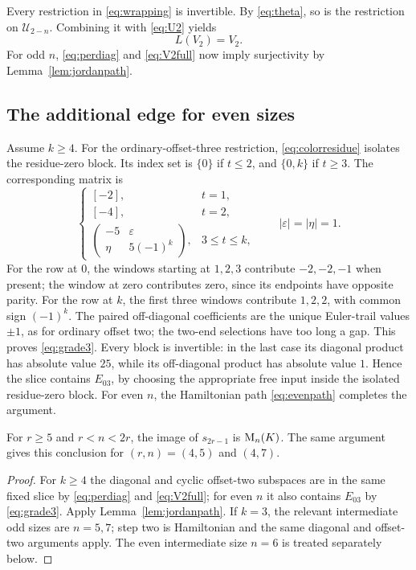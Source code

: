 Every restriction in \eqref{eq:wrapping} is invertible. By
\eqref{eq:theta}, so is the restriction on $\mathcal U_{2-n}$.
Combining it with \eqref{eq:U2} yields
\begin{equation}\label{eq:V2full}
 L(V_2)=V_2.
\end{equation}
For odd $n$, \eqref{eq:perdiag} and \eqref{eq:V2full}
now imply surjectivity by Lemma~\ref{lem:jordanpath}.

\subsection{The additional edge for even sizes}
Assume $k\ge4$. For the ordinary-offset-three restriction,
\eqref{eq:colorresidue} isolates the residue-zero block. Its
index set is $\{0\}$ if $t\le2$, and $\{0,k\}$ if $t\ge3$.
The corresponding matrix is
\begin{equation}\label{eq:grade3}
 \begin{cases}
 [-2],&t=1,\\{}[-4],&t=2,\\
 \begin{pmatrix}-5&\varepsilon\\\eta&5(-1)^k\end{pmatrix},
  &3\le t\le k,
 \end{cases}
 \qquad |\varepsilon|=|\eta|=1.
\end{equation}
For the row at $0$, the windows starting at $1,2,3$ contribute
$-2,-2,-1$ when present; the window at zero contributes zero,
since its endpoints have opposite parity. For the row at $k$,
the first three windows contribute $1,2,2$, with common sign
$(-1)^k$. The paired off-diagonal coefficients are the
unique Euler-trail values $\pm1$, as for ordinary offset two;
the two-end selections have too long a gap. This proves
\eqref{eq:grade3}. Every block is invertible: in the last
case its diagonal product has absolute value $25$, while its
off-diagonal product has absolute value $1$. Hence the slice
contains $E_{03}$, by choosing the appropriate free input
inside the isolated residue-zero block. For even $n$, the
Hamiltonian path \eqref{eq:evenpath} completes the argument.

\begin{proposition}\label{prop:middle}
For $r\ge5$ and $r<n<2r$, the image of $s_{2r-1}$ is
$\mathrm{M}_n(K)$. The same argument gives this conclusion for
$(r,n)=(4,5)$ and $(4,7)$.
\end{proposition}
\begin{proof}
For $k\ge4$ the diagonal and cyclic offset-two subspaces are
in the same fixed slice by \eqref{eq:perdiag} and
\eqref{eq:V2full}; for even $n$ it also contains $E_{03}$
by \eqref{eq:grade3}. Apply Lemma~\ref{lem:jordanpath}.
If $k=3$, the relevant intermediate odd sizes are $n=5,7$;
step two is Hamiltonian and the same diagonal and offset-two
arguments apply. The even intermediate size $n=6$ is treated
separately below.
\end{proof}

